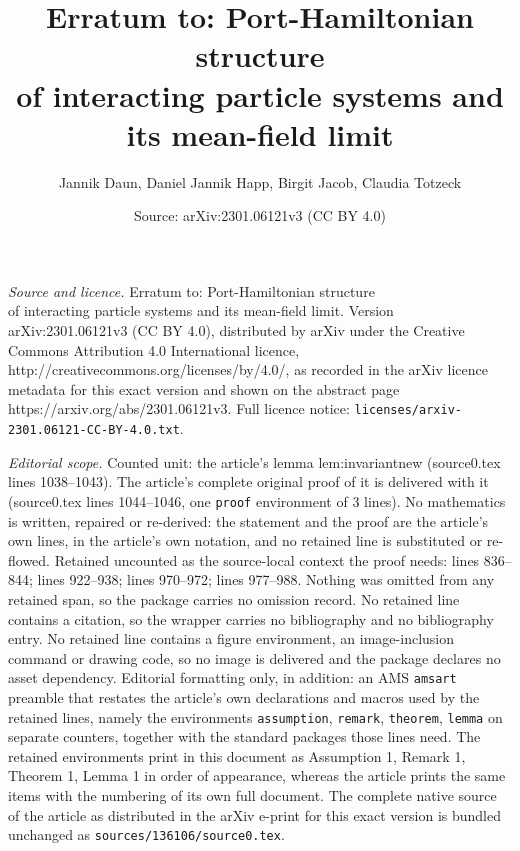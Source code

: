 \documentclass[10pt,a4paper]{amsart}
\title{Erratum to: Port-Hamiltonian structure \\of interacting particle systems and its mean-field limit}
\author{Jannik Daun, Daniel Jannik Happ, Birgit Jacob, Claudia Totzeck}
\date{Source: arXiv:2301.06121v3 (CC BY 4.0)}
\begin{document}
\maketitle

\noindent\emph{Source and licence.} Erratum to: Port-Hamiltonian structure \\of interacting particle systems and its mean-field limit. Version arXiv:2301.06121v3 (CC BY 4.0), distributed by arXiv under the Creative Commons Attribution 4.0 International licence, http://creativecommons.org/licenses/by/4.0/, as recorded in the arXiv licence metadata for this exact version and shown on the abstract page https://arxiv.org/abs/2301.06121v3. Full licence notice: \texttt{licenses/arxiv-2301.06121-CC-BY-4.0.txt}.\par\smallskip

\noindent\textit{Editorial scope.} Counted unit: the article's lemma lem:invariantnew (source0.tex lines 1038--1043). The article's complete original proof of it is delivered with it (source0.tex lines 1044--1046, one \texttt{proof} environment of 3 lines). No mathematics is written, repaired or re-derived: the statement and the proof are the article's own lines, in the article's own notation, and no retained line is substituted or re-flowed.  Retained uncounted as the source-local context the proof needs: lines 836--844; lines 922--938; lines 970--972; lines 977--988.  Nothing was omitted from any retained span, so the package carries no omission record.  No retained line contains a citation, so the wrapper carries no bibliography and no bibliography entry.  No retained line contains a figure environment, an image-inclusion command or drawing code, so no image is delivered and the package declares no asset dependency.  Editorial formatting only, in addition: an AMS \texttt{amsart} preamble that restates the article's own declarations and macros used by the retained lines, namely the environments \texttt{assumption}, \texttt{remark}, \texttt{theorem}, \texttt{lemma} on separate counters, together with the standard packages those lines need.  The retained environments print in this document as Assumption 1, Remark 1, Theorem 1, Lemma 1 in order of appearance, whereas the article prints the same items with the numbering of its own full document.  The complete native source of the article as distributed in the arXiv e-print for this exact version is bundled unchanged as \texttt{sources/136106/source0.tex}.
\end{document}
